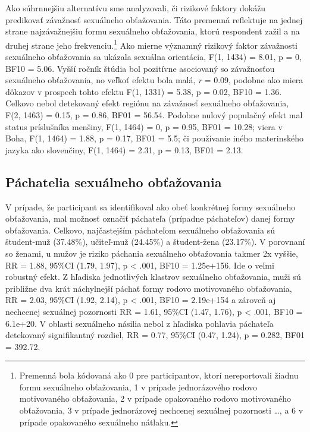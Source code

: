 \documentclass[
]{article}
\begin{document}
Ako súhrnnejšiu alternatívu sme analyzovali, či rizikové faktory dokážu predikovať závažnosť sexuálneho obťažovania. Táto premenná reflektuje na jednej strane najzávažnejšiu formu sexuálneho obťažovania, ktorú respondent zažil a na druhej strane jeho frekvenciu.\footnote{Premenná bola kódovaná ako 0 pre participantov, ktorí nereportovali žiadnu formu sexuálneho obťažovania, 1 v prípade jednorázového rodovo motivovaného obťažovania, 2 v prípade opakovaného rodovo motivovaného obťažovania, 3 v prípade jednorázovej nechcenej sexuálnej pozornosti \ldots, a 6 v prípade opakovaného sexuálneho nátlaku.} Ako mierne významný rizikový faktor závažnosti sexuálneho obťažovania sa ukázala sexuálna orientácia, F(1, 1434) = 8.01, p = 0, BF10 = 5.06. Vyšší ročník štúdia bol pozitívne asociovaný so závažnosťou sexuálneho obťažovania, no veľkoť efektu bola malá, \emph{r} = 0.09, podobne ako miera dôkazov v prospech tohto efektu F(1, 1331) = 5.38, p = 0.02, BF10 = 1.36. Celkovo nebol detekovaný efekt regiónu na závažnosť sexuálneho obťažovania, F(2, 1463) = 0.15, p = 0.86, BF01 = 56.54. Podobne nulový populačný efekt mal status príslušníka menšiny, F(1, 1464) = 0, p = 0.95, BF01 = 10.28; viera v Boha, F(1, 1464) = 1.88, p = 0.17, BF01 = 5.5; či používanie iného materinského jazyka ako slovenčiny, F(1, 1464) = 2.31, p = 0.13, BF01 = 2.13.

\hypertarget{puxe1chatelia-sexuuxe1lneho-obux165aux17eovania}{%
\subsection{Páchatelia sexuálneho obťažovania}\label{puxe1chatelia-sexuuxe1lneho-obux165aux17eovania}}

V prípade, že participant sa identifikoval ako obeť konkrétnej formy sexuálneho obťažovania, mal možnosť označiť páchateľa (prípadne páchateľov) danej formy obťažovania. Celkovo, najčastejším páchateľom sexuálneho obťažovania sú študent-muž (37.48\%), učiteľ-muž (24.45\%) a študent-žena (23.17\%). V porovnaní so ženami, u mužov je riziko páchania sexuálneho obťažovania takmer 2x vyššie, RR = 1.88, 95\%CI (1.79, 1.97), p \textless{} .001, BF10 = 1.25e+156. Ide o veľmi robustný efekt. Z hľadiska jednotlivých klastrov sexuálneho obťažovania, muži sú približne dva krát náchylnejší páchať formy rodovo motivovaného obťažovania, RR = 2.03, 95\%CI (1.92, 2.14), p \textless{} .001, BF10 = 2.19e+154 a zároveň aj nechcenej sexuálnej pozornosti RR = 1.61, 95\%CI (1.47, 1.76), p \textless{} .001, BF10 = 6.1e+20. V oblasti sexuálneho násilia nebol z hľadiska pohlavia páchateľa detekovaný signifikantný rozdiel, RR = 0.77, 95\%CI (0.47, 1.24), p = 0.282, BF01 = 392.72.
\end{document}
